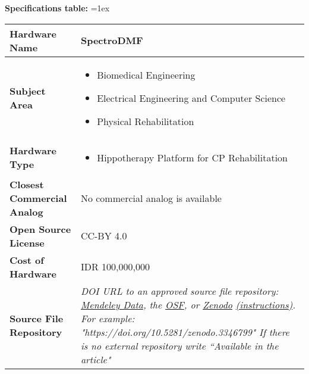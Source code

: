 \newpage
\textbf{Specifications table:}
\tabulinesep=1ex
\begin{tabu} to \linewidth {|l|X[3,l]|}
\hline  \textbf{Hardware Name} & SpectroDMF
  \\
  \hline \textbf{Subject Area} & %
  \begin{itemize}[noitemsep, topsep=0pt]
  \item Biomedical Engineering
  \item Electrical Engineering and Computer Science
  \item Physical Rehabilitation
  \end{itemize}
  \\
  \hline \textbf{Hardware Type} &
  \begin{itemize}[noitemsep, topsep=0pt]
  \item Hippotherapy Platform for CP Rehabilitation
  \end{itemize}
  \\ 
\hline \textbf{Closest Commercial Analog} &
    No commercial analog is available
  \\
\hline \textbf{Open Source License} &
  CC-BY 4.0
  \\
\hline \textbf{Cost of Hardware} &
  IDR 100,000,000
  \\
\hline \textbf{Source File Repository} & 
  \textit{DOI URL to an approved source file repository: \href{https://data.mendeley.com/}{Mendeley Data}, the \href{http://osf.io}{OSF}, or \href{https://zenodo.org/}{Zenodo} \href{https://doi.org/10.5281/zenodo.3346799}{(instructions)}. \linebreak For example: "https://doi.org/10.5281/zenodo.3346799" \linebreak If there is no external repository write “Available in the article"}
\\\hline
\end{tabu}